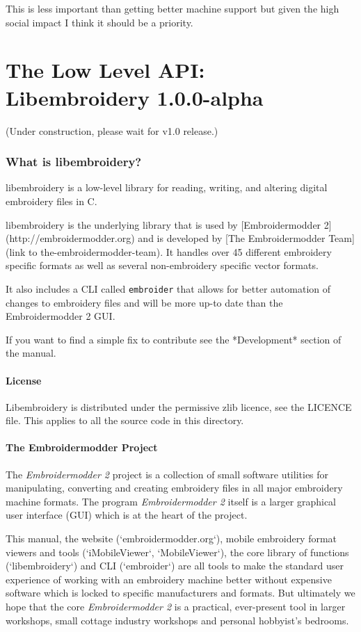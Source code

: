 \documentclass[a4paper, 11pt]{report}
\newcommand{\libembversion}{1.0.0-alpha}
\begin{document}
This is less important than getting better machine support but given the high social impact I think it should be a priority.

\chapter{The Low Level API: Libembroidery \libembversion}

(Under construction, please wait for v1.0 release.)

\subsection{What is libembroidery?}

libembroidery is a low-level library for reading, writing, 
and altering digital embroidery files in C.

libembroidery is the underlying library that is used by [Embroidermodder 2](http://embroidermodder.org)
and is developed by [The Embroidermodder Team](link to the-embroidermodder-team).
It handles over 45 different embroidery specific formats as well
as several non-embroidery specific vector formats.

It also includes a CLI called \texttt{embroider} that allows for better automation of
changes to embroidery files and will be more up-to date than
the Embroidermodder 2 GUI.

If you want to find a simple fix to contribute see the *Development* section
of the manual.

\subsubsection{ License}

Libembroidery is distributed under the permissive zlib licence, see the 
LICENCE file. This applies to all the source code in this directory.

\subsubsection{The Embroidermodder Project}

The \textit{Embroidermodder 2} project is a collection of small software utilities for
manipulating, converting and creating embroidery files in all major embroidery
machine formats. The program \textit{Embroidermodder 2} itself is a larger graphical
user interface (GUI) which is at the heart of the project.

This manual, the website (`embroidermodder.org`), mobile embroidery format viewers
and tools (`iMobileViewer`, `MobileViewer`), the core library of functions
(`libembroidery`) and CLI (`embroider`) are all tools to make the standard
user experience of working with an embroidery machine better without expensive
software which is locked to specific manufacturers and formats. But ultimately
we hope that the core \textit{Embroidermodder 2} is a practical, ever-present tool in
larger workshops, small cottage industry workshops and personal hobbyist's
bedrooms.
\end{document}
